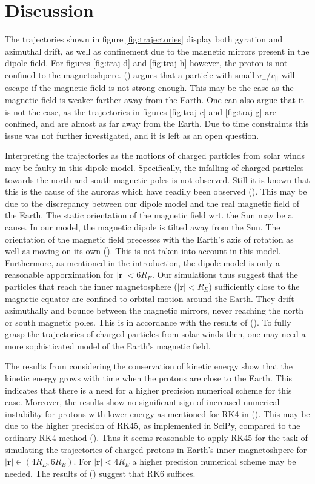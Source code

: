 \section{Discussion}
The trajectories shown in figure \ref{fig:trajectories} display both gyration and azimuthal drift, as well as confinement due to the magnetic mirrors present in the dipole field.
For figures \ref{fig:traj-d} and \ref{fig:traj-h} however, the proton is not confined to the magnetoshpere.
(\cite{chen_2015}) argues that a particle with small $v_\perp / v_{||}$ will escape if the magnetic field is not strong enough. 
This may be the case as the magnetic field is weaker farther away from the Earth. 
One can also argue that it is not the case, as the trajectories in figures \ref{fig:traj-c} and \ref{fig:traj-g} are confined, and are almost as far away from the Earth.
Due to time constraints this issue was not further investigated, and it is left as an open question.


Interpreting the trajectories as the motions of charged particles from solar winds may be faulty in this dipole model. 
Specifically, the infalling of charged particles towards the north and south magnetic poles is not observed. 
Still it is known that this is the cause of the auroras which have readily been observed (\cite{chen_2015}). 
This may be due to the discrepancy between our dipole model and the real magnetic field of the Earth.
The static orientation of the magnetic field wrt. the Sun may be a cause. 
In our model, the magnetic dipole is tilted away from the Sun.
The orientation of the magnetic field precesses with the Earth's axis of rotation as well as moving on its own (\cite{barker_1980}).
This is not taken into account in this model. 
Furthermore, as mentioned in the introduction, the dipole model is only a reasonable apporximation for $|\bm{r}| < 6R_E$.
Our simulations thus suggest that the particles that reach the inner magnetosphere ($|\bm{r}| < R_E$) sufficiently close to the magnetic equator are confined to orbital motion around the Earth.
They drift azimuthally and bounce between the magnetic mirrors, never reaching the north or south magnetic poles. 
This is in accordance with the results of (\cite{soni_2021}).
To fully grasp the trajectories of charged particles from solar winds then, one may need a more sophisticated model of the Earth's magnetic field.

The results from considering the conservation of kinetic energy show that the kinetic energy grows with time when the protons are close to the Earth. 
This indicates that there is a need for a higher precision numerical scheme for this case.
Moreover, the results show no significant sign of increased numerical instability for protons with lower energy as mentioned for RK4 in (\cite{soni_2021}). 
This may be due to the higher precision of RK45, as implemented in SciPy, compared to the ordinary RK4 method (\cite{DORMAND198019}).
Thus it seems reasonable to apply RK45 for the task of simulating the trajectories of charged protons in Earth's inner magnetoshpere for $|\bm{r}| \in (4R_E, 6R_E)$.
For $|\bm{r}|<4R_E$ a higher precision numerical scheme may be needed. 
The results of (\cite{soni_2021}) suggest that RK6 suffices.    

